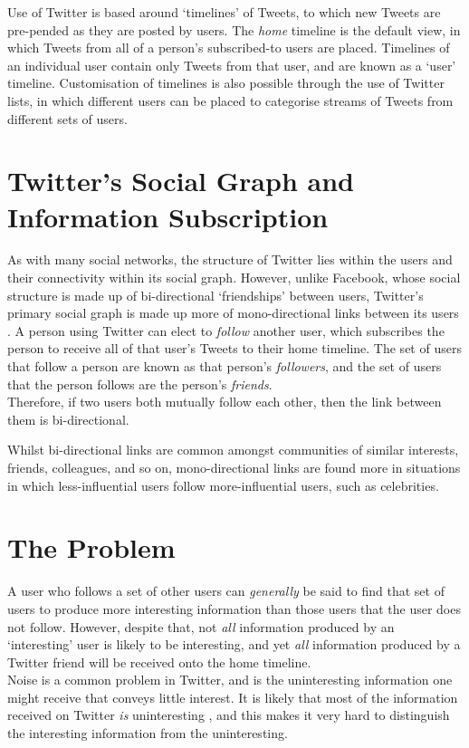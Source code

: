 Use of Twitter is based around `timelines' of Tweets, to which new Tweets are pre-pended as they are posted by users. The \textit{home} timeline is the default view, in which Tweets from all of a person's subscribed-to users are placed. Timelines of an individual user contain only Tweets from that user, and are known as a `user' timeline. Customisation of timelines is also possible through the use of Twitter lists, in which different users can be placed to categorise streams of Tweets from different sets of users.


\section{Twitter's Social Graph and Information Subscription}
As with many social networks, the structure of Twitter lies within the users and their connectivity within its social graph. However, unlike Facebook, whose social structure is made up of bi-directional `friendships' between users, Twitter's primary social graph is made up more of mono-directional links between its users \cite{edwards13}. A person using Twitter can elect to \textit{follow} another user, which subscribes the person to receive all of that user's Tweets to their home timeline. The set of users that follow a person are known as that person's \textit{followers}, and the set of users that the person follows are the person's \textit{friends}.\\
Therefore, if two users both mutually follow each other, then the link between them is bi-directional.

Whilst bi-directional links are common amongst communities of similar interests, friends, colleagues, and so on, mono-directional links are found more in situations in which less-influential users follow more-influential users, such as celebrities.


\section{The Problem}
A user who follows a set of other users can \textit{generally} be said to find that set of users to produce more interesting information than those users that the user does not follow. However, despite that, not \textit{all} information produced by an `interesting' user is likely to be interesting, and yet \textit{all} information produced by a Twitter friend will be received onto the home timeline.\\
Noise is a common problem in Twitter, and is the uninteresting information one might receive that conveys little interest. It is likely that most of the information received on Twitter \textit{is} uninteresting \cite{alonso10}, and this makes it very hard to distinguish the interesting information from the uninteresting.

